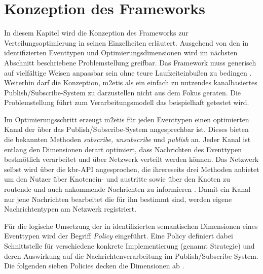 \chapter{Konzeption des Frameworks}
\label{chap:konzeption_pubsub}
In diesem Kapitel wird die Konzeption des Frameworks zur Verteilungsoptimierung in seinen Einzelheiten erläutert. Ausgehend von den in \cite{Ficher2010a} identifizierten Eventtypen und Optimierungsdimensionen wird im nächsten Abschnitt beschriebene Problemstellung greifbar. Das Framework muss generisch auf vielfältige Weisen anpassbar sein ohne teure Laufzeiteinbußen zu bedingen \cite{NEW_PAPER} . Weiterhin darf die Konzeption, \ac{m2etis} als ein einfach zu nutzendes kanalbasiertes Publish/Subscribe-System zu darzustellen nicht aus dem Fokus geraten. Die Problemstellung führt zum Verarbeitungsmodell das beispielhaft getestet wird.

Im Optimierungsschritt erzeugt \ac{m2etis} für jeden Eventtypen einen optimierten Kanal der über das Publish/Subscribe-System angesprechbar ist. Dieses bieten die bekannten Methoden \emph{subscribe, unsubscribe} und \emph{publish} an. Jeder Kanal ist entlang den Dimensionen derart optimiert, dass Nachrichten des Eventtypen bestmötlich verarbeitet und über Netzwerk verteilt werden können. Das Netzwerk selbst wird über die \ac{kbr}-API angesprochen, die ihrereseits drei Methoden anbietet um den Nutzer über Knotenein- und austritte sowie über den Knoten zu routende und auch ankommende Nachrichten zu informieren \cite{Dabek2003Towards}. Damit ein Kanal nur jene Nachrichten bearbeitet die für ihn bestimmt sind, werden eigene Nachrichtentypen am Netzwerk registriert.

Für die logische Umsetzung der in \cite{Fischer2010Event} identifizierten semantischen Dimensionen eines Eventtypen wird der Begriff \emph{Policy} eingeführt. Eine Policy definiert dabei Schnittstelle für verschiedene konkrete Implementierung (genannt Strategie) und deren Auswirkung auf die Nachrichtenverarbeitung im Publish/Subscribe-System. Die folgenden sieben Policies decken die Dimensionen ab \cite{NEW_PAPER}.

